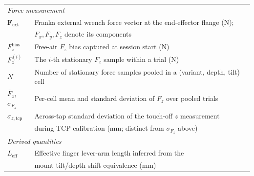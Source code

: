 \medskip
\noindent
\begin{tabular}{l l}
\multicolumn{2}{l}{\textit{Force measurement}} \\ [0.5ex]
$\mathbf{F}_{\text{ext}}$ & Franka external wrench force vector at the end-effector flange (N); \\
                          & $F_x, F_y, F_z$ denote its components \\ [1ex]
$F_z^{\text{bias}}$ & Free-air $F_z$ bias captured at session start (N) \\ [1ex]
$F_z^{(i)}$ & The $i$-th stationary $F_z$ sample within a trial (N) \\ [1ex]
$N$ & Number of stationary force samples pooled in a (variant, depth, tilt) cell \\ [1ex]
$\bar{F}_z$, $\sigma_{F_z}$ & Per-cell mean and standard deviation of $F_z$ over pooled trials \\ [1ex]
$\sigma_{z,\text{tcp}}$ & Across-tap standard deviation of the touch-off $z$ measurement \\
                         & during TCP calibration (mm; distinct from $\sigma_{F_z}$ above) \\ [1ex]
\multicolumn{2}{l}{\textit{Derived quantities}} \\ [0.5ex]
$L_{\mathrm{eff}}$ & Effective finger lever-arm length inferred from the \\
                    & mount-tilt/depth-shift equivalence (mm) \\ [1ex]
\end{tabular}
